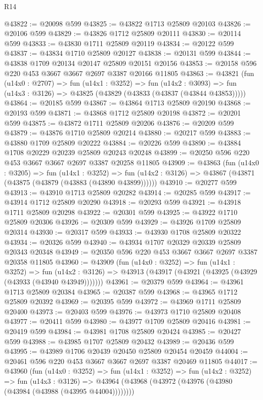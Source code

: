 \begin{lexlean}{R14}
\begin{coremodule}
@43822 := @20098 @599
@43825 := @43822 @1713 @25809 @20103
@43826 := @20106 @599
@43829 := @43826 @1712 @25809 @20111
@43830 := @20114 @599
@43833 := @43830 @1711 @25809 @20119
@43834 := @20122 @599
@43837 := @43834 @1710 @25809 @20127
@43838 := @20131 @599
@43844 := @43838 @1709 @20134 @20147 @25809 @20151 @20156
@43853 := @20158 @596 @220 @453 @3667 @3667 @2697 @3387 @20166 @11805
@43863 := @43821
    (fun (u14x0 : @2707) =>
    fun (u14x1 : @3252) =>
    fun (u14x2 : @3093) => fun (u14x3 : @3126) => @43825 (@43829 (@43833 (@43837 (@43844 @43853)))))
@43864 := @20185 @599
@43867 := @43864 @1713 @25809 @20190
@43868 := @20193 @599
@43871 := @43868 @1712 @25809 @20198
@43872 := @20201 @599
@43875 := @43872 @1711 @25809 @20206
@43876 := @20209 @599
@43879 := @43876 @1710 @25809 @20214
@43880 := @20217 @599
@43883 := @43880 @1709 @25809 @20222
@43884 := @20226 @599
@43890 := @43884 @1708 @20229 @20239 @25809 @20243 @20248
@43899 := @20250 @596 @220 @453 @3667 @3667 @2697 @3387 @20258 @11805
@43909 := @43863
    (fun (u14x0 : @3205) =>
    fun (u14x1 : @3252) =>
    fun (u14x2 : @3126) => @43867 (@43871 (@43875 (@43879 (@43883 (@43890 @43899))))))
@43910 := @20277 @599
@43913 := @43910 @1713 @25809 @20282
@43914 := @20285 @599
@43917 := @43914 @1712 @25809 @20290
@43918 := @20293 @599
@43921 := @43918 @1711 @25809 @20298
@43922 := @20301 @599
@43925 := @43922 @1710 @25809 @20306
@43926 := @20309 @599
@43929 := @43926 @1709 @25809 @20314
@43930 := @20317 @599
@43933 := @43930 @1708 @25809 @20322
@43934 := @20326 @599
@43940 := @43934 @1707 @20329 @20339 @25809 @20343 @20348
@43949 := @20350 @596 @220 @453 @3667 @3667 @2697 @3387 @20358 @11805
@43960 := @43909
    (fun (u14x0 : @3252) =>
    fun (u14x1 : @3252) =>
    fun (u14x2 : @3126) => @43913 (@43917 (@43921 (@43925 (@43929 (@43933 (@43940 @43949)))))))
@43961 := @20379 @599
@43964 := @43961 @1713 @25809 @20384
@43965 := @20387 @599
@43968 := @43965 @1712 @25809 @20392
@43969 := @20395 @599
@43972 := @43969 @1711 @25809 @20400
@43973 := @20403 @599
@43976 := @43973 @1710 @25809 @20408
@43977 := @20411 @599
@43980 := @43977 @1709 @25809 @20416
@43981 := @20419 @599
@43984 := @43981 @1708 @25809 @20424
@43985 := @20427 @599
@43988 := @43985 @1707 @25809 @20432
@43989 := @20436 @599
@43995 := @43989 @1706 @20439 @20450 @25809 @20454 @20459
@44004 := @20461 @596 @220 @453 @3667 @3667 @2697 @3387 @20469 @11805
@44017 := @43960
    (fun (u14x0 : @3252) =>
    fun (u14x1 : @3252) =>
    fun (u14x2 : @3252) =>
    fun (u14x3 : @3126) =>
    @43964 (@43968 (@43972 (@43976 (@43980 (@43984 (@43988 (@43995 @44004))))))))

\end{coremodule}
\end{lexlean}

